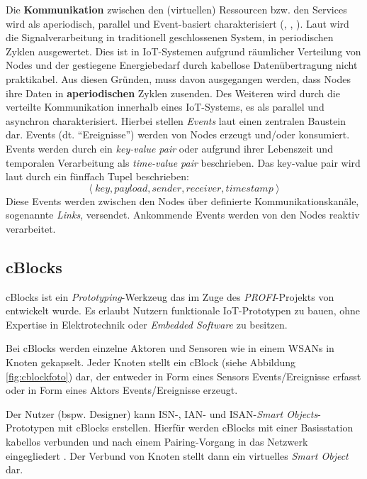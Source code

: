 Die \textbf{Kommunikation} zwischen den (virtuellen) Ressourcen bzw. den Services wird als aperiodisch, parallel und Event-basiert charakterisiert (\cite{serpanos2018iot}, \cite{laliwala2008event}, \cite{lan2014event}). Laut \cite{serpanos2018iot} wird die Signalverarbeitung in traditionell geschlossenen System, in periodischen Zyklen ausgewertet. Dies ist in \ac{IoT}-Systemen aufgrund räumlicher Verteilung von Nodes und der gestiegene Energiebedarf durch kabellose Datenübertragung nicht praktikabel. Aus diesen Gründen, muss davon ausgegangen werden, dass Nodes ihre Daten in \textbf{aperiodischen} Zyklen zusenden. Des Weiteren wird durch die verteilte Kommunikation innerhalb eines \ac{IoT}-Systems, es als parallel und asynchron charakterisiert. Hierbei stellen \textit{Events} laut \cite{serpanos2018iot} einen zentralen Baustein dar. Events (dt. "`Ereignisse"') werden von Nodes erzeugt und/oder konsumiert. Events werden durch ein \textit{key-value pair} oder aufgrund ihrer Lebenszeit und temporalen Verarbeitung als \textit{time-value pair} beschrieben. Das key-value pair wird laut \cite{serpanos2018iot} durch ein fünffach Tupel beschrieben:
\begin{equation}
    \left \langle key, payload, sender, receiver, timestamp \right \rangle
\end{equation}
Diese Events werden zwischen den Nodes über definierte Kommunikationskanäle, sogenannte \textit{Links}, versendet. Ankommende Events werden von den Nodes reaktiv verarbeitet.

\subsection{cBlocks}
\acp{cBlock} ist ein \textit{Prototyping}-Werkzeug das im Zuge des \textit{PROFI}-Projekts von \cite{weckbach2018cblocks} entwickelt wurde. Es erlaubt Nutzern funktionale \ac{IoT}-Prototypen zu bauen, ohne Expertise in Elektrotechnik oder \textit{Embedded Software} zu besitzen.

Bei \acp{cBlock} werden einzelne Aktoren und Sensoren wie in einem \acp{WSAN} in Knoten gekapselt. Jeder Knoten stellt ein \ac{cBlock} (siehe Abbildung \ref{fig:cblockfoto}) dar, der entweder in Form eines Sensors Events/Ereignisse erfasst oder in Form eines Aktors Events/Ereignisse erzeugt. 

Der Nutzer (bspw. Designer) kann ISN-, IAN- und ISAN-\textit{Smart Objects}-Prototypen mit \acp{cBlock} erstellen. Hierfür werden \acp{cBlock} mit einer Basisstation kabellos verbunden und nach einem Pairing-Vorgang in das Netzwerk eingegliedert \cite{serdarusic2018pairing}. Der Verbund von Knoten stellt dann ein virtuelles \textit{Smart Object} dar.


